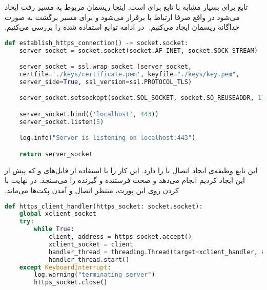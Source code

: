 ‫تابع  برای  بسیار مشابه با تابع  برای  است. اینجا ریسمان مربوط به مسیر رفت ایجاد می‌شود در واقع صرفا ارتباط با  برقرار می‌شود و برای مسیر برگشت به صورت جداگانه ریسمان ایجاد می‌کنیم.
‫
‫در ادامه توابع استفاده شده را بررسی می‌کنیم.
‫
\begin{latin}
\begin{lstlisting}[firstnumber=50, language=Python]
def establish_https_connection() -> socket.socket:
	server_socket = socket.socket(socket.AF_INET, socket.SOCK_STREAM)

	server_socket = ssl.wrap_socket (server_socket,
	certfile='./keys/certificate.pem', keyfile="./keys/key.pem",
	server_side=True, ssl_version=ssl.PROTOCOL_TLS)

	server_socket.setsockopt(socket.SOL_SOCKET, socket.SO_REUSEADDR, 1)	# This solves address aleady in use issue

	server_socket.bind(('localhost', 443))
	server_socket.listen(5)

	log.info("Server is listening on localhost:443")

	return server_socket
\end{lstlisting}
\end{latin}

‫این تابع وظیفه‌ی ایجاد اتصال  با  را دارد. این کار را با استفاده از فایل‌های  و  که پیش از این ایجاد کردیم انجام می‌دهد و صحت فرستنده و گیرنده را می‌سنجد. در نهایت با  کردن روی این پورت، منتظر اتصال  و آمدن پکت‌ها می‌ماند.
‫
\begin{latin}
\begin{lstlisting}[firstnumber=66, language=Python]
def https_client_handler(https_socket: socket.socket):
	global xclient_socket
	try:
		while True:
			client, address = https_socket.accept()
			xclient_socket = client
			handler_thread = threading.Thread(target=xclient_handler, args=(client, address))
			handler_thread.start()
	except KeyboardInterrupt:
		log.warning("terminating server")
		https_socket.close()
\end{lstlisting}
\end{latin}

